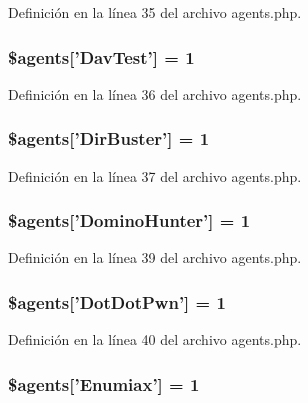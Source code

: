 Definición en la línea 35 del archivo agents.\-php.

\hypertarget{agents_8php_a895d84bac6af0cef0413fe75230cd8c9}{
\subsubsection[{\$agents}]{\setlength{\rightskip}{0pt plus 5cm}\$agents\mbox{[}'Dav\-Test'\mbox{]} = 1}}\label{agents_8php_a895d84bac6af0cef0413fe75230cd8c9}


Definición en la línea 36 del archivo agents.\-php.

\hypertarget{agents_8php_aced24c5cfc428c2fa27954a9b46fc8a7}{
\subsubsection[{\$agents}]{\setlength{\rightskip}{0pt plus 5cm}\$agents\mbox{[}'Dir\-Buster'\mbox{]} = 1}}\label{agents_8php_aced24c5cfc428c2fa27954a9b46fc8a7}


Definición en la línea 37 del archivo agents.\-php.

\hypertarget{agents_8php_a9b73f3b42955b2780f66c9980026ea3a}{
\subsubsection[{\$agents}]{\setlength{\rightskip}{0pt plus 5cm}\$agents\mbox{[}'Domino\-Hunter'\mbox{]} = 1}}\label{agents_8php_a9b73f3b42955b2780f66c9980026ea3a}


Definición en la línea 39 del archivo agents.\-php.

\hypertarget{agents_8php_a92512eef2152bc50fd8d5801454e9a74}{
\subsubsection[{\$agents}]{\setlength{\rightskip}{0pt plus 5cm}\$agents\mbox{[}'Dot\-Dot\-Pwn'\mbox{]} = 1}}\label{agents_8php_a92512eef2152bc50fd8d5801454e9a74}


Definición en la línea 40 del archivo agents.\-php.

\hypertarget{agents_8php_ad793c28ddf7c86e50d35f3c3dac200a2}{
\subsubsection[{\$agents}]{\setlength{\rightskip}{0pt plus 5cm}\$agents\mbox{[}'Enumiax'\mbox{]} = 1}}\label{agents_8php_ad793c28ddf7c86e50d35f3c3dac200a2}


